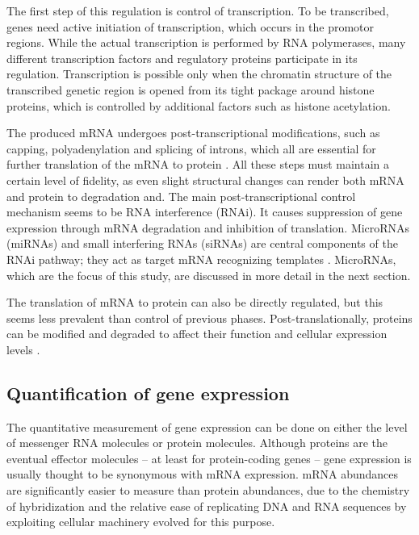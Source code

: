 The first step of this regulation is control of transcription. To be
transcribed, genes need active initiation of transcription, which
occurs in the promotor regions. While the actual transcription is performed by
RNA polymerases, many different transcription factors and regulatory proteins
participate in its regulation. Transcription is possible only when
the chromatin structure of the transcribed genetic region is opened from its
tight package around histone proteins, which is controlled by additional
factors such as histone acetylation.

The produced mRNA undergoes post-transcriptional modifications, such as
capping, polyadenylation and splicing of introns, which all are essential for
further translation of the mRNA to protein \citep{Strachan2011}. All these
steps must maintain a certain level of fidelity, as even slight structural
changes can render both mRNA and protein to degradation and. The main
post-transcriptional control mechanism seems to be RNA interference (RNAi). It
causes suppression of gene expression through mRNA degradation and inhibition of translation.
MicroRNAs (miRNAs) and small interfering RNAs (siRNAs) are central components of the
RNAi pathway; they act as target mRNA recognizing templates \cite{Du2005}.
MicroRNAs, which are the focus of this study, are discussed in more detail in the next section.

The translation of mRNA to protein can also be directly regulated, but this
seems less prevalent than control of previous phases. Post-translationally,
proteins can be modified and degraded to affect their function and cellular
expression levels \citep{Strachan2011}.




\subsection{Quantification of gene expression}\label{measurement-of-gene-expression}

The quantitative measurement of gene expression can be done on either the level of
messenger RNA molecules or protein molecules. Although proteins are the
eventual effector molecules -- at least for protein-coding genes
-- gene expression is usually thought to be synonymous with mRNA expression.
mRNA abundances are significantly easier to measure
than protein abundances, due to the chemistry of hybridization and
the relative ease of replicating DNA and RNA sequences by exploiting cellular
machinery evolved for this purpose.

